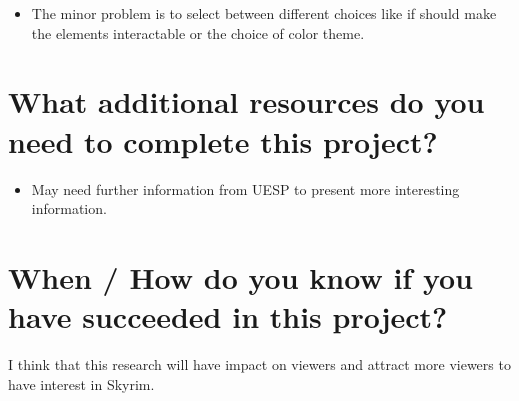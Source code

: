 \documentclass{proc}
\begin{document}
\begin{itemize}
  \item The minor problem is to select between different choices like if should make the elements interactable or the choice of color theme.
\end{itemize}

\section{What additional resources do you need to complete this project?}

\begin{itemize}
  \item May need further information from UESP to present more interesting information.
 \end{itemize}

\section{When / How do you know if you have succeeded in this project?}

I think that this research will have impact on viewers and attract more viewers to have interest in Skyrim.

%
\end{document}

